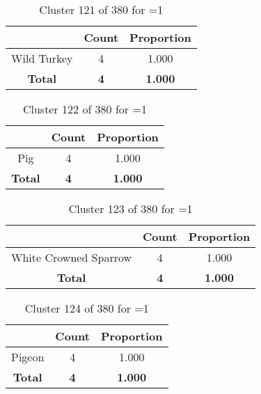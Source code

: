 \begin{table}[ht!]
\centering
\begin{tabular}{|c|c|c|}
\hline
\bf \Spec{} &\bf Count &\bf Proportion\\ \hline \hline
Wild Turkey & 4 & 1.000\\ \hline
\hline
\bf Total & \bf 4 & \bf 1.000\\ \hline
\end{tabular}
\label{tab:cluster:121:1}
\caption{Cluster 121 of 380 for \minneigh{}=1}
\end{table}

\begin{table}[ht!]
\centering
\begin{tabular}{|c|c|c|}
\hline
\bf \Spec{} &\bf Count &\bf Proportion\\ \hline \hline
Pig & 4 & 1.000\\ \hline
\hline
\bf Total & \bf 4 & \bf 1.000\\ \hline
\end{tabular}
\label{tab:cluster:122:1}
\caption{Cluster 122 of 380 for \minneigh{}=1}
\end{table}

\begin{table}[ht!]
\centering
\begin{tabular}{|c|c|c|}
\hline
\bf \Spec{} &\bf Count &\bf Proportion\\ \hline \hline
White Crowned Sparrow & 4 & 1.000\\ \hline
\hline
\bf Total & \bf 4 & \bf 1.000\\ \hline
\end{tabular}
\label{tab:cluster:123:1}
\caption{Cluster 123 of 380 for \minneigh{}=1}
\end{table}

\begin{table}[ht!]
\centering
\begin{tabular}{|c|c|c|}
\hline
\bf \Spec{} &\bf Count &\bf Proportion\\ \hline \hline
Pigeon & 4 & 1.000\\ \hline
\hline
\bf Total & \bf 4 & \bf 1.000\\ \hline
\end{tabular}
\label{tab:cluster:124:1}
\caption{Cluster 124 of 380 for \minneigh{}=1}
\end{table}

